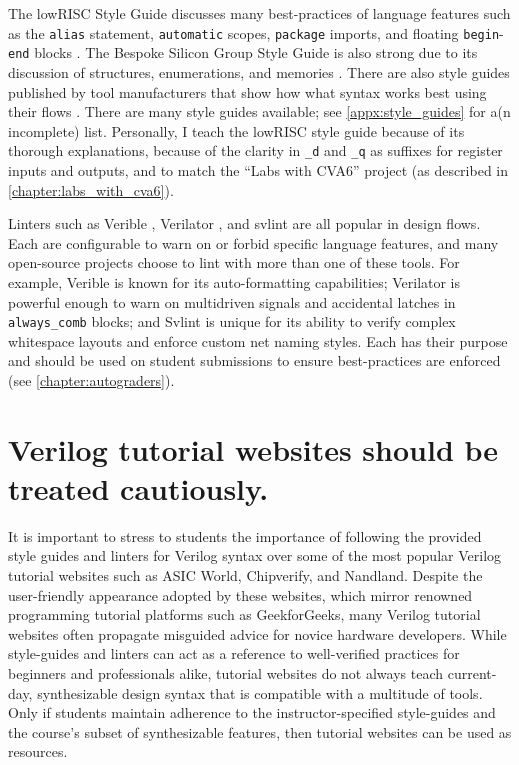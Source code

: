 The lowRISC Style Guide discusses many best-practices of language features such as the \texttt{alias} statement, \texttt{automatic} scopes, \texttt{package} imports, and floating \texttt{begin}-\texttt{end} blocks \cite{lowRISCstyleguides}. The Bespoke Silicon Group Style Guide is also strong due to its discussion of structures, enumerations, and memories \cite{BSGstyleguide}. There are also style guides published by tool manufacturers that show how what syntax works best using their flows \cite{Xilinxstyleguide, Intelstyleguide, Latticestyleguide}. There are many style guides available; see \autoref{appx:style_guides} for a(n incomplete) list. Personally, I teach the lowRISC style guide because of its thorough explanations, because of the clarity in \texttt{_d} and \texttt{_q} as suffixes for register inputs and outputs, and to match the \enquote{Labs with CVA6} project (as described in \autoref{chapter:labs_with_cva6}).

Linters such as Verible \cite{veribleGitHub}, Verilator \cite{verilatorGitHub}, and svlint \cite{svlintGitHub} are all popular in design flows. Each are configurable to warn on or forbid specific language features, and many open-source projects choose to lint with more than one of these tools. For example, Verible is known for its auto-formatting capabilities; Verilator is powerful enough to warn on multidriven signals and accidental latches in \texttt{always_comb} blocks; and Svlint is unique for its ability to verify complex whitespace layouts and enforce custom net naming styles. Each has their purpose and should be used on student submissions to ensure best-practices are enforced (see \autoref{chapter:autograders}).

\section{Verilog tutorial websites should be treated cautiously.}
\label{section:tutorial_websites}

It is important to stress to students the importance of following the provided style guides and linters for Verilog syntax over some of the most popular Verilog tutorial websites such as ASIC World, Chipverify, and Nandland. Despite the user-friendly appearance adopted by these websites, which mirror renowned programming tutorial platforms such as GeekforGeeks, many Verilog tutorial websites often propagate misguided advice for novice hardware developers. While style-guides and linters can act as a reference to well-verified practices for beginners and professionals alike, tutorial websites do not always teach current-day, synthesizable design syntax that is compatible with a multitude of tools. Only if students maintain adherence to the instructor-specified style-guides and the course's subset of synthesizable features, then tutorial websites can be used as resources.

